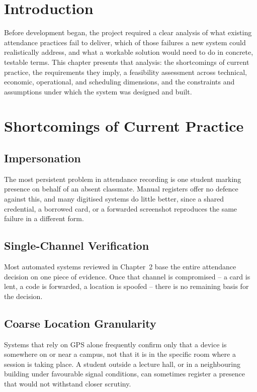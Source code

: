 \documentclass[12pt, a4paper, oneside]{report}
\begin{document}
\section{Introduction}

Before development began, the project required a clear analysis of what existing attendance practices fail to deliver, which of those failures a new system could realistically address, and what a workable solution would need to do in concrete, testable terms. This chapter presents that analysis: the shortcomings of current practice, the requirements they imply, a feasibility assessment across technical, economic, operational, and scheduling dimensions, and the constraints and assumptions under which the system was designed and built.

\section{Shortcomings of Current Practice}

\subsection{Impersonation}
The most persistent problem in attendance recording is one student marking presence on behalf of an absent classmate. Manual registers offer no defence against this, and many digitised systems do little better, since a shared credential, a borrowed card, or a forwarded screenshot reproduces the same failure in a different form.

\subsection{Single-Channel Verification}
Most automated systems reviewed in Chapter~2 base the entire attendance decision on one piece of evidence. Once that channel is compromised -- a card is lent, a code is forwarded, a location is spoofed -- there is no remaining basis for the decision.

\subsection{Coarse Location Granularity}
Systems that rely on GPS alone frequently confirm only that a device is somewhere on or near a campus, not that it is in the specific room where a session is taking place. A student outside a lecture hall, or in a neighbouring building under favourable signal conditions, can sometimes register a presence that would not withstand closer scrutiny.
\end{document}
